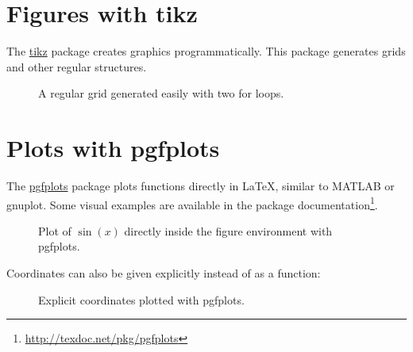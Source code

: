 \documentclass[../main-german]{subfiles}
\begin{document}
\section{Figures with tikz}

The \href{https://ctan.org/pkg/pgf}{tikz} package creates graphics programmatically.
This package generates grids and other regular structures.

\begin{ltgexample}
\begin{figure}[ht]
  \centering
  \caption{A regular grid generated easily with two for loops.}\label{fig:tikz_example}
\end{figure}
\end{ltgexample}

\section{Plots with pgfplots}

The \href{https://ctan.org/pkg/pgfplots}{pgfplots} package plots functions directly in \LaTeX{}, similar to MATLAB or gnuplot.
Some visual examples are available in the package documentation\footnote{\url{http://texdoc.net/pkg/pgfplots}}.

\begin{ltgexample}
\begin{figure}[ht]
  \centering
  \caption{Plot of $\sin(x)$ directly inside the figure environment with pgfplots.}
  \label{fig:pgfplots_example}
\end{figure}
\end{ltgexample}

Coordinates can also be given explicitly instead of as a function:
\begin{ltgexample}
\begin{figure}[ht]
  \centering
  \caption{Explicit coordinates plotted with pgfplots.}
  \label{fig:pgfplots_coords}
\end{figure}
\end{ltgexample}
\end{document}
